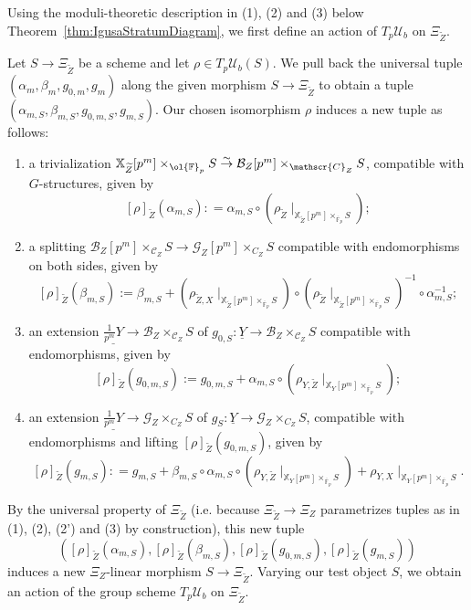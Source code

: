 \documentclass[letterpaper,11pt]{amsart}
\begin{document}
Using the moduli-theoretic description in (1), (2) and (3) below Theorem~\ref{thm:IgusaStratumDiagram}, we first define an action of $T_p\mathcal{U}_b$ on $\Xi_{\widetilde{Z}}$. 

\begin{definition}\label{defn:dd action}
Let $S\to \Xi_{\widetilde{Z}}$ be a scheme and let $\rho\in T_p\mathcal{U}_b(S)$. We pull back the universal tuple $(\alpha_m, \beta_m, g_{0,m}, g_m)$ along the given morphism $S\to \Xi_{\widetilde{Z}}$ to obtain a tuple $(\alpha_{m,S}, \beta_{m,S},g_{0,m,S}, g_{m,S})$. Our chosen isomorphism $\rho$ induces a new tuple as follows:

\begin{enumerate}
\item a trivialization  $\mathbb{X}_{\widetilde{Z}}[p^m]\times_{\ol{\mathbb{F}}_p}S\stackrel{\sim}{\to} \mathcal{B}_{Z}[p^m]\times_{\mathscr{C}_Z} S$, compatible with $G$-structures, given by 
\[
[\rho]_{\widetilde{Z}}(\alpha_{m,S}): = \alpha_{m,S} \circ \left(\rho_{\widetilde{Z}}\mid_{\mathbb{X}_{\widetilde{Z}}[p^m]\times_{\overline{\mathbb{F}}_p}S}\right);
\]

\item a splitting $\mathcal{B}_Z[p^m]\times_{\mathscr{C}_Z} S\to \mathscr{G}_{Z}[p^m]\times_{C_Z}S$ compatible with endomorphisms on both sides, given by 
\[
[\rho]_{\widetilde{Z}}(\beta_{m,S}) := \beta_{m,S} + \left(\rho_{\widetilde{Z},X}\mid_{\mathbb{X}_{\widetilde{Z}}[p^m]\times_{\overline{\mathbb{F}}_p}S}\right)\circ \left(\rho_{\widetilde{Z}}\mid_{\mathbb{X}_{\widetilde{Z}}[p^m]\times_{\overline{\mathbb{F}}_p}S}\right)^{-1}\circ \alpha_{m,S}^{-1};
\]

\item[(\theenumi')] an extension $\underline{\frac{1}{p^m}Y}\to \mathcal{B}_{Z}\times_{\mathscr{C}_Z}S$ of $g_{0,S}: \underline{Y}\to \mathcal{B}_{Z}\times_{\mathscr{C}_Z}S$ compatible with endomorphisms, given by  
\[
[\rho]_{\widetilde{Z}}(g_{0,m,S}) := g_{0,m,S} + \alpha_{m,S}\circ \left(\rho_{Y, \widetilde{Z}}\mid_{\mathbb{X}_Y[p^m]\times_{\overline{\mathbb{F}}_p}S}\right);
\]

\item an extension $\underline{\frac{1}{p^m}Y}\to \mathcal{G}_{Z}\times_{C_Z}S$ of $g_{S}:\underline{Y} \to \mathcal{G}_{Z}\times_{C_Z}S$, compatible with endomorphisms and lifting $[\rho]_{\widetilde{Z}}(g_{0,m,S})$, given by 
\[
[\rho]_{\widetilde{Z}}(g_{m,S}): = g_{m,S} + \beta_{m,S}\circ \alpha_{m,S} \circ \left(\rho_{Y,\widetilde{Z}}\mid_{\mathbb{X}_Y[p^m]\times_{\overline{\mathbb{F}}_p}S}\right) + \rho_{Y, X}\mid_{\mathbb{X}_Y[p^m]\times_{\overline{\mathbb{F}}_p}S}.
\]  
\end{enumerate}
By the universal property of $\Xi_{\widetilde{Z}}$ (i.e. because $\Xi_{\widetilde{Z}}\to \Xi_{Z}$ parametrizes tuples as in (1), (2), (2') and (3) by construction), this new tuple
\[
\left([\rho]_{\widetilde{Z}}(\alpha_{m,S}), [\rho]_{\widetilde{Z}}(\beta_{m,S}), [\rho]_{\widetilde{Z}}(g_{0,m,S}), [\rho]_{\widetilde{Z}}(g_{m,S})
\right)
\]
induces a new $\Xi_Z$-linear morphism $S\to \Xi_{\widetilde{Z}}$. Varying our test object $S$, we obtain an action of the group scheme $T_p\mathcal{U}_b$ on $\Xi_{\widetilde{Z}}$. 
\end{definition}
\end{document}
